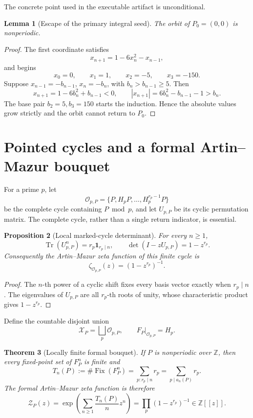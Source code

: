 \documentclass[11pt]{article}
\newtheorem{theorem}{Theorem}[section]
\newtheorem{proposition}[theorem]{Proposition}
\newtheorem{lemma}[theorem]{Lemma}
\theoremstyle{remark}
\newcommand{\Fix}{\operatorname{Fix}}
\newcommand{\Tr}{\operatorname{Tr}}
\newcommand{\Z}{\mathbb Z}
\newcommand{\cO}{\mathcal O}
\newcommand{\cX}{\mathcal X}
\begin{document}
The concrete point used in the executable artifact is unconditional.

\begin{lemma}[Escape of the primary integral seed]
\label{lem:escape}
The orbit of \(P_0=(0,0)\) is nonperiodic.
\end{lemma}

\begin{proof}
The first coordinate satisfies
\[
 x_{n+1}=1-6x_n^2-x_{n-1},
\]
and begins
\[
 x_0=0,\qquad x_1=1,\qquad x_2=-5,\qquad x_3=-150.
\]
Suppose \(x_{n-1}=-b_{n-1}\), \(x_n=-b_n\), with
\(b_n>b_{n-1}\ge5\).  Then
\[
 x_{n+1}=1-6b_n^2+b_{n-1}<0,
 \qquad
 |x_{n+1}|=6b_n^2-b_{n-1}-1>b_n.
\]
The base pair \(b_2=5,b_3=150\) starts the induction.  Hence the absolute
values grow strictly and the orbit cannot return to \(P_0\).
\end{proof}

\section{Pointed cycles and a formal Artin--Mazur bouquet}

For a prime \(p\), let
\[
 \cO_{p,P}=\{P,H_pP,\ldots,H_p^{r_p-1}P\}
\]
be the complete cycle containing \(P\bmod p\), and let \(U_{p,P}\) be its
cyclic permutation matrix.  The complete cycle, rather than a single return
indicator, is essential.

\begin{proposition}[Local marked-cycle determinant]
\label{prop:local-cycle}
For every \(n\ge1\),
\[
 \Tr(U_{p,P}^n)=r_p\mathbf 1_{r_p\mid n},
 \qquad
 \det(I-zU_{p,P})=1-z^{r_p}.
\]
Consequently the Artin--Mazur zeta function of this finite cycle is
\[
 \zeta_{\cO_{p,P}}(z)=(1-z^{r_p})^{-1}.
\]
\end{proposition}

\begin{proof}
The \(n\)-th power of a cyclic shift fixes every basis vector exactly when
\(r_p\mid n\).  The eigenvalues of \(U_{p,P}\) are all \(r_p\)-th roots of
unity, whose characteristic product gives \(1-z^{r_p}\).
\end{proof}

Define the countable disjoint union
\[
 \cX_P=\bigsqcup_p\cO_{p,P},
 \qquad
 F_P|_{\cO_{p,P}}=H_p.
\]

\begin{theorem}[Locally finite formal bouquet]
\label{thm:bouquet}
If \(P\) is nonperiodic over \(\Z\), then every fixed-point set of \(F_P^n\)
is finite and
\[
 T_n(P):=\#\Fix(F_P^n)
 =\sum_{p:r_p\mid n}r_p
 =\sum_{p\mid a_n(P)}r_p.
 \label{eq:bouquet-trace}
\]
The formal Artin--Mazur zeta function is therefore
\[
 \mathcal Z_P(z)
 =\exp\!\left(\sum_{n\ge1}\frac{T_n(P)}n z^n\right)
 =\prod_p(1-z^{r_p})^{-1}
 \in\Z[[z]].
 \label{eq:formal-zeta}
\]
\end{theorem}
\end{document}
